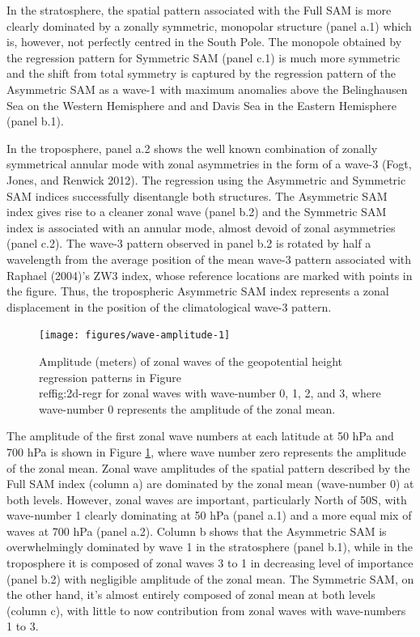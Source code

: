 \documentclass[smallextended]{svjour3}       %
\begin{document}
In the stratosphere, the spatial pattern associated with the Full SAM is more clearly dominated by a zonally symmetric, monopolar structure (panel a.1) which is, however, not perfectly centred in the South Pole. The monopole obtained by the regression pattern for Symmetric SAM (panel c.1) is much more symmetric and the shift from total symmetry is captured by the regression pattern of the Asymmetric SAM as a wave-1 with maximum anomalies above the Belinghausen Sea on the Western Hemisphere and and Davis Sea in the Eastern Hemisphere (panel b.1).

In the troposphere, panel a.2 shows the well known combination of zonally symmetrical annular mode with zonal asymmetries in the form of a wave-3 (Fogt, Jones, and Renwick 2012). The regression using the Asymmetric and Symmetric SAM indices successfully disentangle both structures. The Asymmetric SAM index gives rise to a cleaner zonal wave (panel b.2) and the Symmetric SAM index is associated with an annular mode, almost devoid of zonal asymmetries (panel c.2). The wave-3 pattern observed in panel b.2 is rotated by half a wavelength from the average position of the mean wave-3 pattern associated with Raphael (2004)'s ZW3 index, whose reference locations are marked with points in the figure. Thus, the tropospheric Asymmetric SAM index represents a zonal displacement in the position of the climatological wave-3 pattern.

\begin{figure}
\texttt{[image: figures/wave-amplitude-1]} \caption{Amplitude (meters) of zonal waves of the geopotential height regression patterns in Figure \\ref{fig:2d-regr} for zonal waves with wave-number 0, 1, 2, and 3, where wave-number 0 represents the amplitude of the zonal mean.}\label{fig:wave-amplitude}
\end{figure}

The amplitude of the first zonal wave numbers at each latitude at 50 hPa and 700 hPa is shown in Figure \ref{fig:wave-amplitude}, where wave number zero represents the amplitude of the zonal mean. Zonal wave amplitudes of the spatial pattern described by the Full SAM index (column a) are dominated by the zonal mean (wave-number 0) at both levels. However, zonal waves are important, particularly North of 50\degree S, with wave-number 1 clearly dominating at 50 hPa (panel a.1) and a more equal mix of waves at 700 hPa (panel a.2). Column b shows that the Asymmetric SAM is overwhelmingly dominated by wave 1 in the stratosphere (panel b.1), while in the troposphere it is composed of zonal waves 3 to 1 in decreasing level of importance (panel b.2) with negligible amplitude of the zonal mean. The Symmetric SAM, on the other hand, it's almost entirely composed of zonal mean at both levels (column c), with little to now contribution from zonal waves with wave-numbers 1 to 3.
\end{document}
